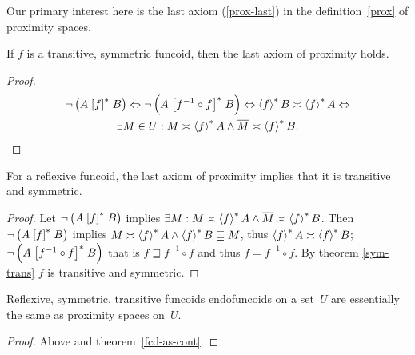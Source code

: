 Our primary interest here is the last axiom (\ref{prox-last}) in
the definition~\ref{prox} of proximity spaces.
\begin{prop}
If $f$ is a transitive, symmetric funcoid, then the last axiom of
proximity holds.\end{prop}
\begin{proof}
~
\begin{multline*}
\neg\left(A\mathrel{\left[f\right]^{\ast}}B\right)\Leftrightarrow\neg\left(A\mathrel{\left[f^{-1}\circ
f\right]^{\ast}}B\right)\Leftrightarrow\left\langle f\right\rangle ^{\ast}B\asymp\left\langle f\right\rangle ^{\ast}A\Leftrightarrow\\
\exists M\in U:M\asymp\left\langle f\right\rangle ^{\ast}A\wedge\overline{M}\asymp\left\langle f\right\rangle ^{\ast}B.
\end{multline*}
\end{proof}
\begin{prop}
For a reflexive funcoid, the last axiom of proximity implies that
it is transitive and symmetric.\end{prop}
\begin{proof}
Let $\neg\left(A\mathrel{\left[f\right]^{\ast}}B\right)$ implies $\exists M:M\asymp\left\langle f\right\rangle ^{\ast}A\wedge\overline{M}\asymp\left\langle f\right\rangle ^{\ast}B$.
Then $\neg\left(A\mathrel{\left[f\right]^{\ast}}B\right)$ implies $M\asymp\left\langle f\right\rangle ^{\ast}A\land\left\langle f\right\rangle ^{\ast}B\sqsubseteq M$,
thus $\left\langle f\right\rangle ^{\ast}A\asymp\left\langle f\right\rangle ^{\ast}B$; $\neg\left(A\mathrel{\left[f^{-1}\circ
f\right]^{\ast}}B\right)$
that is $f\sqsupseteq f^{-1}\circ f$ and thus $f=f^{-1}\circ f$.
By theorem \ref{sym-trans} $f$ is transitive and symmetric.\end{proof}
\begin{thm}
Reflexive, symmetric, transitive funcoids endofuncoids on a set~$U$
are essentially the same as proximity spaces on~$U$.\end{thm}
\begin{proof}
Above and theorem~\ref{fcd-as-cont}.\end{proof}
